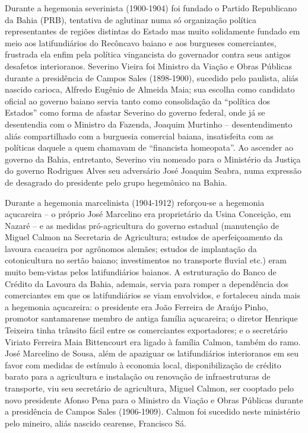 Durante a hegemonia severinista (1900-1904) foi fundado o Partido Republicano da Bahia (PRB), tentativa de aglutinar numa só organização política representantes de regiões distintas do Estado mas muito solidamente fundado em meio aos latifundiários do Recôncavo baiano e aos burgueses comerciantes, frustrada ela enfim pela política vingancista do governador contra seus antigos desafetos interioranos. Severino Vieira foi Ministro da Viação e Obras Públicas durante a presidência de Campos Sales (1898-1900), sucedido pelo paulista, aliás nascido carioca, Alfredo Eugênio de Almeida Maia; sua escolha como candidato oficial ao governo baiano servia tanto como consolidação da ``política dos Estados'' como forma de afastar Severino do governo federal, onde já se desentendia com o Ministro da Fazenda, Joaquim Murtinho -- desentendimento aliás compartilhado com a burguesia comercial baiana, insatisfeita com as políticas daquele a quem chamavam de ``financista homeopata''. Ao ascender ao governo da Bahia, entretanto, Severino viu nomeado para o Ministério da Justiça do governo Rodrigues Alves seu adversário José Joaquim Seabra, numa expressão de desagrado do presidente pelo grupo hegemônico na Bahia. 

Durante a hegemonia marcelinista (1904-1912) reforçou-se a hegemonia açucareira -- o próprio José Marcelino era proprietário da Usina Conceição, em Nazaré -- e as medidas pró-agricultura do governo estadual (manutenção de Miguel Calmon na Secretaria de Agricultura; estudos de aperfeiçoamento da lavoura cacaueira por agrônomos alemães; estudos de implantação da cotonicultura no sertão baiano; investimentos no transporte fluvial etc.) eram muito bem-vistas pelos latifundiários baianos. A estruturação do Banco de Crédito da Lavoura da Bahia, ademais, servia para romper a dependência dos comerciantes em que os latifundiários se viam envolvidos, e fortaleceu ainda mais a hegemonia açucareira: o presidente era João Ferreira de Araújo Pinho, promotor santamarense membro de antiga família açucareira; o diretor Henrique Teixeira tinha trânsito fácil entre os comerciantes exportadores; e o secretário Viriato Ferreira Maia Bittencourt era ligado à família Calmon, também do ramo. José Marcelino de Sousa, além de apaziguar os latifundiários interioranos em seu favor com medidas de estímulo à economia local, disponibilização de crédito barato para a agricultura e instalação ou renovação de infraestruturas de transporte, viu seu secretário de agricultura, Miguel Calmon, ser cooptado pelo novo presidente Afonso Pena para o Ministro da Viação e Obras Públicas durante a presidência de Campos Sales (1906-1909). Calmon foi sucedido neste ministério pelo mineiro, aliás nascido cearense, Francisco Sá.

